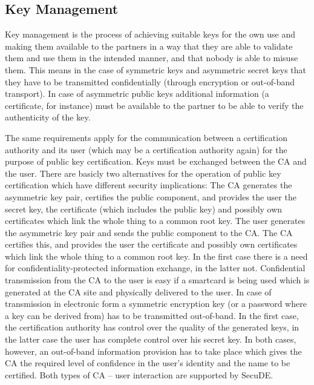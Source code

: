 \subsection{Key Management}
Key management is the process of achieving suitable keys for the own use
and making them available to the partners in a way that they
are able to validate them and use them in the intended manner, and that
nobody is able to misuse them. This means in the case of symmetric keys 
and asymmetric secret keys that they have to be transmitted 
confidentially (through encryption or out-of-band transport). 
In case of asymmetric public keys additional information (a certificate, for instance) 
must be available to the partner to be able to verify the authenticity of the key.

The same requirements apply for the communication between a certification
authority and its user (which may be a certification authority again)
for the purpose of public key certification. Keys must be exchanged between 
the CA and the user. There are basicly two alternatives for the operation
of public key certification which have different security implications:
\be
\m The CA generates the asymmetric key pair, certifies the public component,
   and provides the user the secret key, the certificate (which includes the
   public key) and possibly own certificates
   which link the whole thing to a common root key.
\m The user generates the asymmetric key pair and sends the public component
   to the CA. The CA certifies this, and provides the user the certificate and possibly 
   own certificates which link the whole thing to a common root key.
\ee
In the first case there is a need for confidentiality-protected information
exchange, in the latter not. Confidential transmission from the CA to the user
is easy if a smartcard is being used which is generated at the CA site and
physically delivered to the user. In case of transmission in electronic form
a symmetric encryption key (or a password where a key can be derived from)
has to be transmitted out-of-band. In the first case, the certification authority
has control over the quality of the generated keys, in the latter case the
user has complete control over his secret key. In both cases, however,
an out-of-band information provision has to take place which gives the CA
the required level of confidence in the user's identity and the name to be certified.
Both types of CA -- user interaction are supported by SecuDE.   


